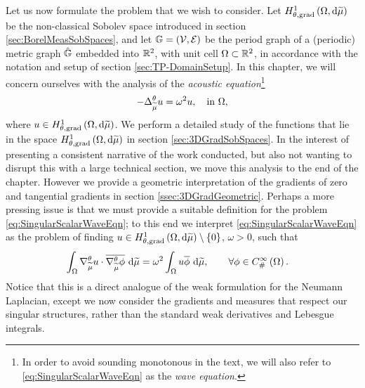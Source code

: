 Let us now formulate the problem that we wish to consider.
Let $H^1_{\theta, \mathrm{grad}}\left( \Omega, \mathrm{d}\widetilde{\mu} \right)$ be the non-classical Sobolev space introduced in section \ref{sec:BorelMeasSobSpaces}, and let $\mathbb{G}=\left( \mathcal{V}, \mathcal{E} \right)$ be the period graph of a (periodic) metric graph $\hat{\mathbb{G}}$ embedded into $\mathbb{R}^2$, with unit cell $\Omega\subset\mathbb{R}^2$, in accordance with the notation and setup of section \ref{sec:TP-DomainSetup}.
In this chapter, we will concern ourselves with the analysis of the \emph{acoustic equation}\footnote{In order to avoid sounding monotonous in the text, we will also refer to \eqref{eq:SingularScalarWaveEqn} as the \emph{wave equation}.}
\begin{align} \label{eq:SingularScalarWaveEqn}
	-\Delta_{\widetilde{\mu}}^{\theta} u = \omega^2 u, \quad\text{in } \Omega,
\end{align}
where $u\in H^1_{\theta, \mathrm{grad}}\left( \Omega, \mathrm{d}\widetilde{\mu} \right)$.
We perform a detailed study of the functions that lie in the space $H^1_{\theta, \mathrm{grad}}\left( \Omega, \mathrm{d}\widetilde{\mu} \right)$ in section \ref{sec:3DGradSobSpaces}.
In the interest of presenting a consistent narrative of the work conducted, but also not wanting to disrupt this with a large technical section, we move this analysis to the end of the chapter.
However we provide a geometric interpretation of the gradients of zero and tangential gradients in section \ref{ssec:3DGradGeometric}.
Perhaps a more pressing issue is that we must provide a suitable definition for the problem \eqref{eq:SingularScalarWaveEqn}; to this end we interpret \eqref{eq:SingularScalarWaveEqn} as the problem of finding $u\in H^1_{\theta, \mathrm{grad}}\left( \Omega, \mathrm{d}\widetilde{\mu} \right)\setminus\left\{ 0 \right\}$, $\omega>0$, such that
\begin{align} \label{eq:SingularScalarWaveEqn-VariationalForm}
	\int_{\Omega} \nabla^{\theta}_{\widetilde{\mu}}u\cdot\overline{\nabla^{\theta}_{\widetilde{\mu}}\phi}  \ \mathrm{d}\widetilde{\mu}
	&= \omega^2 \int_{\Omega} u\overline{\phi}  \ \mathrm{d}\widetilde{\mu},
	\qquad\forall\phi\in C^{\infty}_{\#}\left( \Omega \right).
\end{align}
Notice that this is a direct analogue of the weak formulation for the Neumann Laplacian, except we now consider the gradients and measures that respect our singular structures, rather than the standard weak derivatives and Lebesgue integrals.

